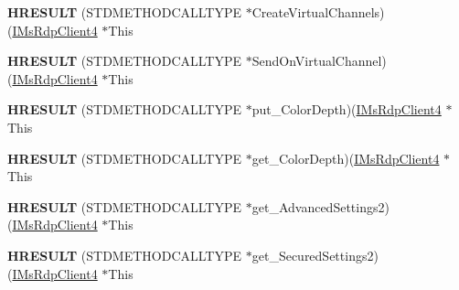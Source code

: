 \begin{DoxyCompactItemize}
\item 
\mbox{\label{struct_m_s_t_s_c_lib_1_1_i_ms_rdp_client4_vtbl_ae842cceeeb0318b43e7fa95555d06731}} 
{\bfseries H\+R\+E\+S\+U\+LT} (S\+T\+D\+M\+E\+T\+H\+O\+D\+C\+A\+L\+L\+T\+Y\+PE $\ast$Create\+Virtual\+Channels)(\hyperlink{interface_m_s_t_s_c_lib_1_1_i_ms_rdp_client4}{I\+Ms\+Rdp\+Client4} $\ast$This
\item 
\mbox{\label{struct_m_s_t_s_c_lib_1_1_i_ms_rdp_client4_vtbl_ae974a23800ca42d997ce75f528dc612e}} 
{\bfseries H\+R\+E\+S\+U\+LT} (S\+T\+D\+M\+E\+T\+H\+O\+D\+C\+A\+L\+L\+T\+Y\+PE $\ast$Send\+On\+Virtual\+Channel)(\hyperlink{interface_m_s_t_s_c_lib_1_1_i_ms_rdp_client4}{I\+Ms\+Rdp\+Client4} $\ast$This
\item 
\mbox{\label{struct_m_s_t_s_c_lib_1_1_i_ms_rdp_client4_vtbl_ac719fa97dc774c61dba7cd5810a21d49}} 
{\bfseries H\+R\+E\+S\+U\+LT} (S\+T\+D\+M\+E\+T\+H\+O\+D\+C\+A\+L\+L\+T\+Y\+PE $\ast$put\+\_\+\+Color\+Depth)(\hyperlink{interface_m_s_t_s_c_lib_1_1_i_ms_rdp_client4}{I\+Ms\+Rdp\+Client4} $\ast$This
\item 
\mbox{\label{struct_m_s_t_s_c_lib_1_1_i_ms_rdp_client4_vtbl_aa2f2b80943462b8fa492ea09a49feac5}} 
{\bfseries H\+R\+E\+S\+U\+LT} (S\+T\+D\+M\+E\+T\+H\+O\+D\+C\+A\+L\+L\+T\+Y\+PE $\ast$get\+\_\+\+Color\+Depth)(\hyperlink{interface_m_s_t_s_c_lib_1_1_i_ms_rdp_client4}{I\+Ms\+Rdp\+Client4} $\ast$This
\item 
\mbox{\label{struct_m_s_t_s_c_lib_1_1_i_ms_rdp_client4_vtbl_abb1559d5b9201d7f0046dc98671d5605}} 
{\bfseries H\+R\+E\+S\+U\+LT} (S\+T\+D\+M\+E\+T\+H\+O\+D\+C\+A\+L\+L\+T\+Y\+PE $\ast$get\+\_\+\+Advanced\+Settings2)(\hyperlink{interface_m_s_t_s_c_lib_1_1_i_ms_rdp_client4}{I\+Ms\+Rdp\+Client4} $\ast$This
\item 
\mbox{\label{struct_m_s_t_s_c_lib_1_1_i_ms_rdp_client4_vtbl_a66e037d9c915c35ad5527bbc79e2ada5}} 
{\bfseries H\+R\+E\+S\+U\+LT} (S\+T\+D\+M\+E\+T\+H\+O\+D\+C\+A\+L\+L\+T\+Y\+PE $\ast$get\+\_\+\+Secured\+Settings2)(\hyperlink{interface_m_s_t_s_c_lib_1_1_i_ms_rdp_client4}{I\+Ms\+Rdp\+Client4} $\ast$This

\end{DoxyCompactItemize}
